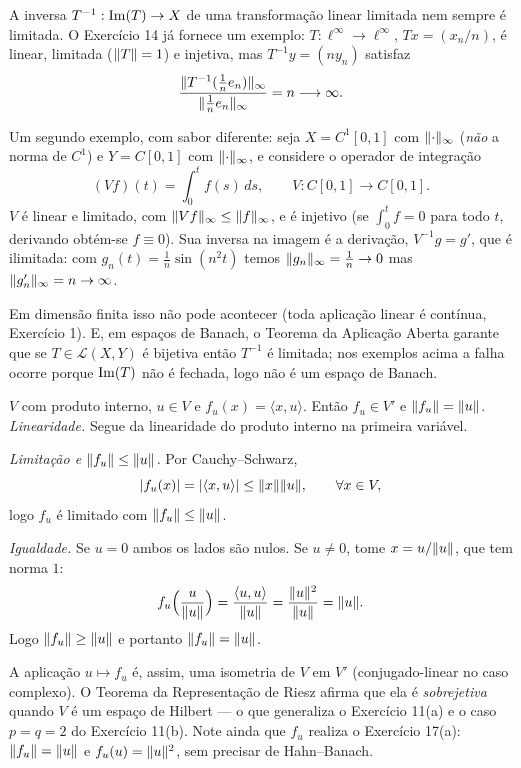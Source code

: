 \begin{exercicio}{A inversa $T^{-1}:\operatorname{Im}(T)\to X$ de uma transformação linear limitada nem sempre é limitada.}
\sol
O Exercício 14 já fornece um exemplo: $T:\ell^\infty\to \ell^\infty$, $Tx=(x_n/n)$, é linear, limitada ($\lVert T\rVert=1$) e injetiva, mas $T^{-1}y=(ny_n)$ satisfaz
\[ \frac{\lVert T^{-1}(\frac1ne_n)\rVert_\infty}{\lVert\frac1ne_n\rVert_\infty}=n\longrightarrow\infty. \]

Um segundo exemplo, com sabor diferente: seja $X=C^1[0,1]$ com $\lVert\cdot\rVert_\infty$ (\emph{não} a norma de $C^1$) e $Y=C[0,1]$ com $\lVert\cdot\rVert_\infty$, e considere o operador de integração
\[ (Vf)(t)=\int_0^tf(s)\,ds,\qquad V:C[0,1]\to C[0,1]. \]
$V$ é linear e limitado, com $\lVert Vf\rVert_\infty\le\lVert f\rVert_\infty$, e é injetivo (se $\int_0^tf=0$ para todo $t$, derivando obtém-se $f\equiv0$). Sua inversa na imagem é a derivação, $V^{-1}g=g'$, que é ilimitada: com $g_n(t)=\frac1n\sin(n^2t)$ temos $\lVert g_n\rVert_\infty=\frac1n\to0$ mas $\lVert g_n'\rVert_\infty=n\to\infty$.

\begin{obs}
Em dimensão finita isso não pode acontecer (toda aplicação linear é contínua, Exercício 1). E, em espaços de Banach, o Teorema da Aplicação Aberta garante que se $T\in\mathcal{L}(X,Y)$ é bijetiva então $T^{-1}$ é limitada; nos exemplos acima a falha ocorre porque $\operatorname{Im}(T)$ não é fechada, logo não é um espaço de Banach.
\end{obs}
\end{exercicio}

\begin{exercicio}{$V$ com produto interno, $u\in V$ e $f_u(x)=\langle x,u\rangle$. Então $f_u\in V'$ e $\lVert f_u\rVert=\lVert u\rVert$.}
\sol
\emph{Linearidade.} Segue da linearidade do produto interno na primeira variável.

\emph{Limitação e $\lVert f_u\rVert\le\lVert u\rVert$.} Por Cauchy--Schwarz,
\[ \lvert f_u(x)\rvert=\lvert\langle x,u\rangle\rvert\le\lVert x\rVert\lVert u\rVert,\qquad\forall x\in V, \]
logo $f_u$ é limitado com $\lVert f_u\rVert\le\lVert u\rVert$.

\emph{Igualdade.} Se $u=0$ ambos os lados são nulos. Se $u\neq0$, tome $x=u/\lVert u\rVert$, que tem norma $1$:
\[ f_u\Bigl(\frac{u}{\lVert u\rVert}\Bigr)=\frac{\langle u,u\rangle}{\lVert u\rVert}=\frac{\lVert u\rVert^2}{\lVert u\rVert}=\lVert u\rVert. \]
Logo $\lVert f_u\rVert\ge\lVert u\rVert$ e portanto $\lVert f_u\rVert=\lVert u\rVert$.

\begin{obs}
A aplicação $u\mapsto f_u$ é, assim, uma isometria de $V$ em $V'$ (conjugado-linear no caso complexo). O Teorema da Representação de Riesz afirma que ela é \emph{sobrejetiva} quando $V$ é um espaço de Hilbert --- o que generaliza o Exercício 11(a) e o caso $p=q=2$ do Exercício 11(b). Note ainda que $f_u$ realiza o Exercício 17(a): $\lVert f_u\rVert=\lVert u\rVert$ e $f_u(u)=\lVert u\rVert^2$, sem precisar de Hahn--Banach.
\end{obs}
\end{exercicio}

